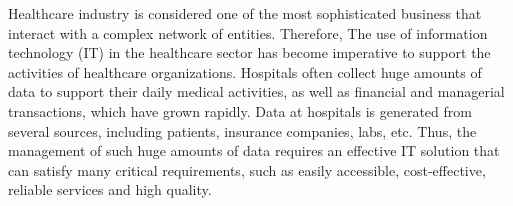 
Healthcare industry is considered one of the most sophisticated business that interact with a complex network of entities. Therefore, The use of information technology (IT) in the healthcare sector has become imperative to support the activities of healthcare organizations. Hospitals often collect huge amounts of data to support their daily medical activities, as well as financial and managerial transactions, which have grown rapidly. Data at hospitals is generated from several sources,
including patients, insurance companies, labs, etc. Thus, the management of such huge amounts of data requires an effective IT solution that can satisfy many critical requirements, such as easily accessible, cost-effective, reliable services and high quality.  
